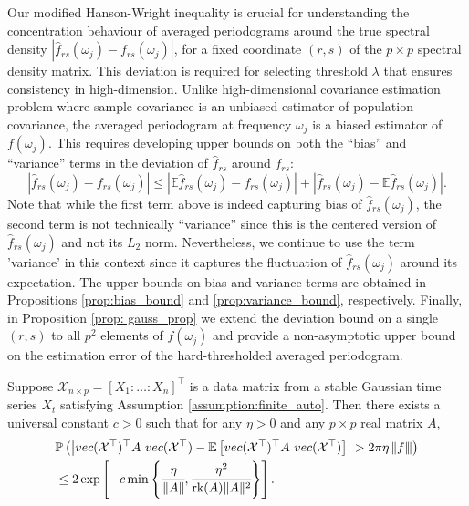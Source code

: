 Our modified Hanson-Wright inequality is crucial for understanding the concentration behaviour of averaged periodograms around the true spectral density $\left| \hat{f}_{rs}(\omega_j) - f_{rs}(\omega_j) \right|$, for a fixed coordinate $(r,s)$ of the $p\times p$ spectral density matrix. This deviation is required for selecting threshold $\lambda$ that ensures consistency in high-dimension. Unlike high-dimensional covariance estimation problem where sample covariance is an unbiased estimator of population covariance, the averaged periodogram at frequency $\omega_j$ is a biased estimator of $f(\omega_j)$. This requires developing upper bounds on both the ``bias'' and ``variance'' terms in the deviation of $\hat{f}_{rs}$ around $f_{rs}$: 
\begin{equation}
\left|\hat{f}_{rs}(\omega_j) - f_{rs}(\omega_j)\right| \le \left|\mathbb{E}\hat{f}_{rs}(\omega_j) - f_{rs}(\omega_j)\right| + \left| \hat{f}_{rs}(\omega_j) - \mathbb{E}\hat{f}_{rs}(\omega_j) \right|. \nonumber
\end{equation}
Note that while the first term above is indeed capturing bias of $\hat{f}_{rs}(\omega_j)$, the second term is not technically ``variance'' since this is the centered version of $\hat{f}_{rs}(\omega_j)$ and not its $L_2$ norm. Nevertheless, we continue to use the term 'variance' in this context since it captures the fluctuation of $\hat{f}_{rs}(\omega_j)$ around its expectation. The upper bounds on bias and variance terms are obtained in Propositions \ref{prop:bias_bound} and \ref{prop:variance_bound}, respectively. Finally, in Proposition \ref{prop: gauss_prop} we extend the deviation bound on a single $(r,s)$ to all $p^2$ elements of $f(\omega_j)$ and provide a non-asymptotic upper bound on the estimation error of the hard-thresholded averaged periodogram.


\begin{lem}
\label{lemma: hason_bound_time_gauss}
Suppose $\mathcal{\mathcal{X}}_{n\times p} = [X_1:\ldots:X_n]^\top$ is a data matrix from a stable  Gaussian time series $X_t$ satisfying Assumption \ref{assumption:finite_auto}. Then there exists a universal constant $c>0$ such that for any $\eta > 0$ and any $p \times p$ real matrix $A$, 
\begin{equation}
\begin{aligned}
&\mathbb{P}\left(\left|vec(\mathcal{\mathcal{X}}^\top)^\top A ~vec(\mathcal{\mathcal{X}}^\top) - \mathbb{E} \left[vec(\mathcal{\mathcal{X}}^\top)^\top A ~vec(\mathcal{\mathcal{X}}^\top)\right]\right| >2\pi \eta{\left\vert\kern-0.25ex\left\vert\kern-0.25ex\left\vert f \right\vert\kern-0.25ex\right\vert\kern-0.25ex\right\vert} \right) \nonumber \\
&\le 2\exp\left[-c\min\left\{\cfrac{\eta}{\|A\|}, \cfrac{\eta^2}{\mbox{rk}(A)\|A\|^2}\right\}\right]. \nonumber
\end{aligned}
\end{equation}
\end{lem}

